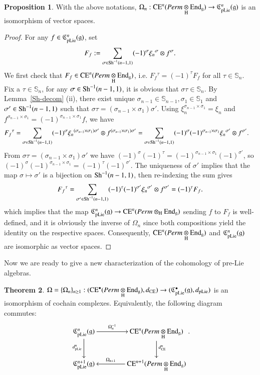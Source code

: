 \documentclass[12pt]{amsart}
\theoremstyle{definition}
\newtheorem{thm}{Theorem}[section]
\newtheorem{pro}[thm]{Proposition}
\newcommand{\g}{\mathfrak g}
\newcommand{\frkC}{\mathfrak C}
\newcommand{\End}{\mathrm{End}}
\newcommand{\ot}{\otimes}
\newcommand{\s}{\mathbb{S}}
\newcommand{\Sh}{{\rm Sh}}
\newcommand{\ce}{{\rm CE}}
\newcommand{\pl}{{\rm pLie}}
\begin{document}
\begin{pro}\label{Omega}
With the above notations, $\Omega_n:\ce^n(Perm\underset{{\rm H}}{\ot}\End_\g)\to \frkC_{\pl}^n(\g)$ is an isomorphism of vector spaces.
\end{pro}
\begin{proof}
For any $f\in\frkC_{\pl}^n(\g)$, set
\[
F_f := \sum_{\sigma\in\Sh^{-1}(n-1,1)} (-1)^\sigma {\xi_n}^\sigma \ot f^\sigma.
\]
We first check that $F_f\in\ce^n(Perm\underset{\rm H}{\ot}\End_\g)$, i.e. $F_f{}^\tau = (-1)^\tau F_f$ for all $\tau\in\s_n$.
Fix a $\tau\in\s_n$, for any $\sigma\in\Sh^{-1}(n-1,1)$, it is obvious that $\sigma\tau\in\s_n$.
By Lemma~\ref{Sh-decom} (ii), there exist unique $\sigma_{n-1}\in\s_{n-1},\sigma_1\in\s_1$ and $\sigma'\in\Sh^{-1}(n-1,1)$ such that $\sigma\tau = (\sigma_{n-1}\times\sigma_1)\sigma'$.
Using $\xi_n^{\sigma_{n-1}\times\sigma_1}=\xi_n$ and  $f^{\sigma_{n-1}\times\sigma_1}=(-1)^{\sigma_{n-1}\times\sigma_1}f$, we have
\begin{align*}
F_f{}^\tau
&=\sum_{\sigma\in\Sh^{-1}(n-1,1)} (-1)^\sigma {\xi_n}^{(\sigma_{n-1}\times\sigma_1)\sigma'} \ot f^{(\sigma_{n-1}\times\sigma_1)\sigma'} =\sum_{\sigma\in\Sh^{-1}(n-1,1)} (-1)^\sigma (-1)^{\sigma_{n-1}\times\sigma_1} {\xi_n}^{\sigma'} \ot f^{\sigma'} .
\end{align*}
From $\sigma\tau = (\sigma_{n-1}\times\sigma_1)\sigma'$ we have $(-1)^\sigma (-1)^\tau = (-1)^{\sigma_{n-1}\times\sigma_1} (-1)^{\sigma'}$, so $(-1)^\sigma (-1)^{\sigma_{n-1}\times\sigma_1} = (-1)^\tau (-1)^{\sigma'}$.
The uniqueness of $\sigma'$ implies that the map $\sigma\mapsto\sigma'$ is a bijection on $\Sh^{-1}(n-1,1)$, then re-indexing the sum gives
\[
F_f{}^\tau =\sum_{\sigma'\in\Sh^{-1}(n-1,1)} (-1)^\tau (-1)^{\sigma'} {\xi_n}^{\sigma'} \ot f^{\sigma'} = (-1)^\tau F_f .
\]
which implies that the map $\frkC^n_{\pl}(\g)\to\ce^n(Perm\otimes_{\rm H}\End_\g)$ sending $f$ to $F_f$ is well-defined,
and it is obviously the inverse of $\Omega_{n}$ since both compositions yield the identity on the respective spaces. Consequently, $\ce^n(Perm\underset{{\rm H}}{\ot}\End_\g)$ and $\frkC_{\pl}^n(\g)$ are isomorphic as vector spaces.
\end{proof}


Now we are ready to give a new characterization of the cohomology of pre-Lie algebras.

\begin{thm}\label{pre-Lie-cochain}
$\Omega=\{\Omega_n\}_{n\geq 1}:(\ce^\bullet(Perm\underset{{\rm H}}{\ot}\End_\g),d_\ce)\to(\frkC_{\pl}^\bullet(\g),d_\pl)$ is an isomorphism of cochain complexes.
Equivalently, the following diagram
commutes:
\[
\xymatrix@C=4em{
	\frkC_{\pl}^n(\g)
	\ar[r]^-{\Omega_n^{-1}}
	\ar[d]_{d_\pl^n}
	&
	\ce^n(Perm\underset{{\rm H}}{\ot}\End_\g)
	\ar[d]^{d_\ce^n}
	\\
	\frkC_{\pl}^{n+1}(\g)
	&
	\ce^{n+1}(Perm\underset{{\rm H}}{\ot}\End_\g)
	\ar[l]_-{\Omega_{n+1}}
}.
\]
\end{thm}
\end{document}
